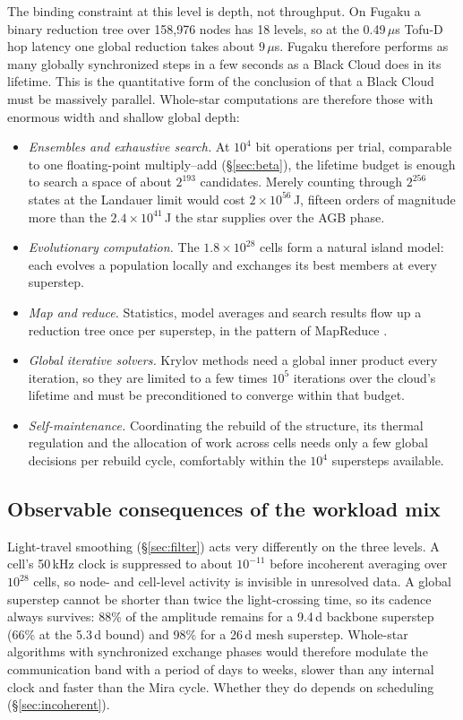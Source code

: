 \documentclass[final,5p]{elsarticle}
\begin{document}
The binding constraint at this level is depth, not throughput. On Fugaku a binary reduction tree over 158{,}976 nodes \citep{RIKEN2021} has 18 levels, so at the 0.49\,$\mu$s Tofu-D hop latency \citep{Ajima2018} one global reduction takes about $9\,\mu$s. Fugaku therefore performs as many globally synchronized steps in a few seconds as a Black Cloud does in its lifetime. This is the quantitative form of the conclusion of \citet{LaughlinAdams2021} that a Black Cloud must be massively parallel. Whole-star computations are therefore those with enormous width and shallow global depth:
\begin{itemize}
\item \emph{Ensembles and exhaustive search.} At $10^4$ bit operations per trial, comparable to one floating-point multiply--add (\S\ref{sec:beta}), the lifetime budget is enough to search a space of about $2^{193}$ candidates. Merely counting through $2^{256}$ states at the Landauer limit would cost $2\times10^{56}$\,J, fifteen orders of magnitude more than the $2.4\times10^{41}$\,J the star supplies over the AGB phase.
\item \emph{Evolutionary computation.} The $1.8\times10^{28}$ cells form a natural island model: each evolves a population locally and exchanges its best members at every superstep.
\item \emph{Map and reduce.} Statistics, model averages and search results flow up a reduction tree once per superstep, in the pattern of MapReduce \citep{Dean2008}.
\item \emph{Global iterative solvers.} Krylov methods need a global inner product every iteration, so they are limited to a few times $10^5$ iterations over the cloud's lifetime and must be preconditioned to converge within that budget.
\item \emph{Self-maintenance.} Coordinating the rebuild of the structure, its thermal regulation and the allocation of work across cells needs only a few global decisions per rebuild cycle, comfortably within the $10^4$ supersteps available.
\end{itemize}

\subsection{Observable consequences of the workload mix}
Light-travel smoothing (\S\ref{sec:filter}) acts very differently on the three levels. A cell's 50\,kHz clock is suppressed to about $10^{-11}$ before incoherent averaging over $10^{28}$ cells, so node- and cell-level activity is invisible in unresolved data. A global superstep cannot be shorter than twice the light-crossing time, so its cadence always survives: 88\% of the amplitude remains for a 9.4\,d backbone superstep (66\% at the 5.3\,d bound) and 98\% for a 26\,d mesh superstep. Whole-star algorithms with synchronized exchange phases would therefore modulate the communication band with a period of days to weeks, slower than any internal clock and faster than the Mira cycle. Whether they do depends on scheduling (\S\ref{sec:incoherent}).
\end{document}
